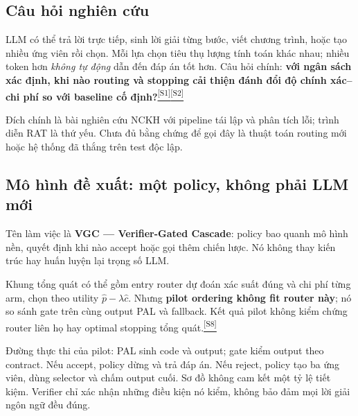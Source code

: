 \documentclass[11pt,a4paper]{article}
\newcommand{\src}[1]{\hyperlink{src-#1}{\textcolor{muted}{\textsuperscript{[S#1]}}}}
\begin{document}
\subsection{Câu hỏi nghiên cứu}
LLM có thể trả lời trực tiếp, sinh lời giải từng bước, viết chương trình, hoặc tạo nhiều ứng viên rồi chọn. Mỗi lựa chọn tiêu thụ lượng tính toán khác nhau; nhiều token hơn \emph{không tự động} dẫn đến đáp án tốt hơn. Câu hỏi chính: \textbf{với ngân sách xác định, khi nào routing và stopping cải thiện đánh đổi độ chính xác--chi phí so với baseline cố định?}\src{1}\src{2}

Đích chính là bài nghiên cứu NCKH với pipeline tái lập và phân tích lỗi; trình diễn RAT là thứ yếu. Chưa đủ bằng chứng để gọi đây là thuật toán routing mới hoặc hệ thống đã thắng trên test độc lập.

\subsection{Mô hình đề xuất: một policy, không phải LLM mới}
Tên làm việc là \textbf{VGC --- Verifier-Gated Cascade}: policy bao quanh mô hình nền, quyết định khi nào accept hoặc gọi thêm chiến lược. Nó không thay kiến trúc hay huấn luyện lại trọng số LLM.

Khung tổng quát có thể gồm entry router dự đoán xác suất đúng và chi phí từng arm, chọn theo utility $\hat p-\lambda\hat c$. Nhưng \textbf{pilot ordering không fit router này}; nó so sánh gate trên cùng output PAL và fallback. Kết quả pilot không kiểm chứng router liên họ hay optimal stopping tổng quát.\src{8}

Đường thực thi của pilot: PAL sinh code và output; gate kiểm output theo contract.
Nếu accept, policy dừng và trả đáp án. Nếu reject, policy tạo ba ứng viên,
dùng selector và chấm output cuối.
Sơ đồ không cam kết một tỷ lệ tiết kiệm. Verifier chỉ xác nhận những điều kiện nó kiểm, không bảo đảm mọi lời giải ngôn ngữ đều đúng.
\end{document}
